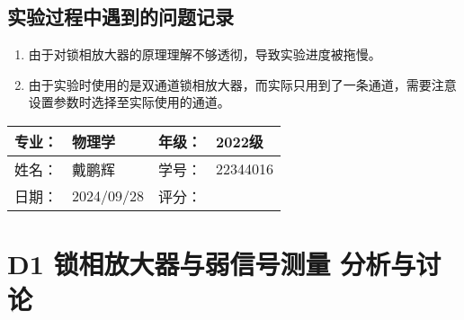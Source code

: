 \documentclass[dvipsnames, svgnames,a4paper,11pt]{article}
\begin{document}









\clearpage
\subsection{实验过程中遇到的问题记录}

\begin{enumerate}
	\item 由于对锁相放大器的原理理解不够透彻，导致实验进度被拖慢。
	\item 由于实验时使用的是双通道锁相放大器，而实际只用到了一条通道，需要注意设置参数时选择至实际使用的通道。
	
\end{enumerate}
	

\clearpage
\begin{table}
	\renewcommand\arraystretch{1.7}
	\begin{tabularx}{\textwidth}{|X|X|X|X|}
	\hline
	专业：& 物理学 &年级：& 2022级\\
	\hline
	姓名： & 戴鹏辉 & 学号：& 22344016\\
	\hline
    日期：& 2024/09/28 & 评分： &\\
	\hline
	\end{tabularx}
\end{table}

\section{D1 \quad 锁相放大器与弱信号测量 \quad\heiti 分析与讨论}
\end{document}
